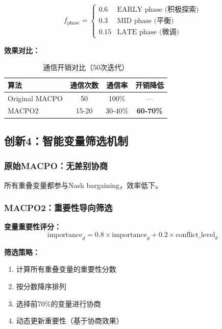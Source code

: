 \documentclass[15pt,a3paper]{ctexart}
\begin{document}
\begin{equation}
f_{\text{phase}} = \begin{cases}
0.6 & \text{EARLY phase (积极探索)} \\
0.3 & \text{MID phase (平衡)} \\
0.15 & \text{LATE phase (微调)}
\end{cases}
\end{equation}

\textbf{效果对比：}
\begin{table}[h]
\centering
\caption{通信开销对比（50次迭代）}
\begin{tabular}{|l|c|c|c|}
\hline
\textbf{算法} & \textbf{通信次数} & \textbf{通信率} & \textbf{开销降低} \\
\hline
Original MACPO & 50 & 100\% & --- \\
MACPO2 & 15-20 & 30-40\% & \textbf{60-70\%} \\
\hline
\end{tabular}
\end{table}

\subsection{创新4：智能变量筛选机制}

\subsubsection{原始MACPO：无差别协商}

所有重叠变量都参与Nash bargaining，效率低下。

\subsubsection{MACPO2：重要性导向筛选}

\textbf{变量重要性评分：}
\begin{equation}
\text{importance}_d = 0.8 \times \text{importance}_d + 0.2 \times \text{conflict\_level}_d
\end{equation}

\textbf{筛选策略：}
\begin{enumerate}
    \item 计算所有重叠变量的重要性分数
    \item 按分数降序排列
    \item 选择前70\%的变量进行协商
    \item 动态更新重要性（基于协商效果）
\end{enumerate}
\end{document}
